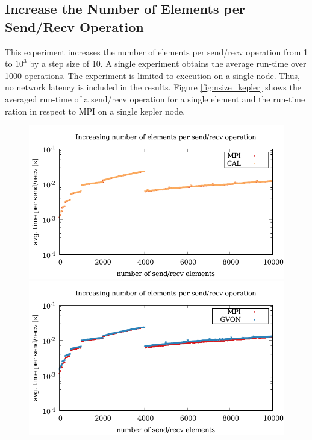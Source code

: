 \subsection*{Increase the Number of Elements per Send/Recv Operation}
This experiment increases the number of elements per send/recv
operation from 1 to $10^3$ by a step size of 10. A single experiment
obtains the average run-time over 1000 operations.  The experiment is
limited to execution on a single node. Thus, no network latency is
included in the results. Figure \ref{fig:nsize_kepler} shows the
averaged run-time of a send/recv operation for a single element and
the run-time ration in respect to MPI on a single kepler node.

\begin{figure}[H]
  \begin{minipage}[t]{0.5\textwidth}
    \includegraphics[width=\textwidth]{plots/50_nsize_cal_laser}
    \includegraphics[width=\textwidth]{plots/50_nsize_gvon_laser}

\end{minipage}
\end{figure}
